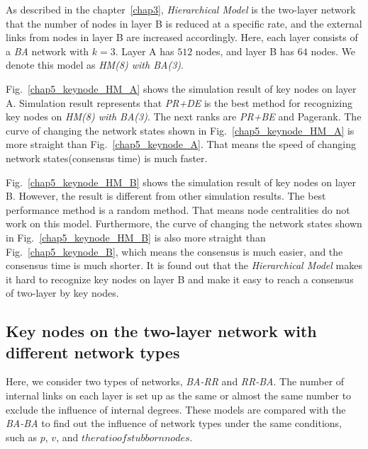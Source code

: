 As described in the chapter~\ref{chap3}, \textit{Hierarchical Model} is the two-layer network that the number of nodes in layer B is reduced at a specific rate, and the external links from nodes in layer B are increased accordingly. Here, each layer consists of a \textit{BA} network with $k=3$. Layer A has $512$ nodes, and layer B has $64$ nodes. We denote this model as \textit{HM(8) with BA(3)}.

Fig.~\ref{chap5_keynode_HM_A} shows the simulation result of key nodes on layer A. Simulation result represents that \textit{PR+DE} is the best method for recognizing key nodes on \textit{HM(8) with BA(3)}. The next ranks are \textit{PR+BE} and Pagerank. The curve of changing the network states shown in Fig.~\ref{chap5_keynode_HM_A} is more straight than Fig.~\ref{chap5_keynode_A}. That means the speed of changing network states(consensus time) is much faster. 

Fig.~\ref{chap5_keynode_HM_B} shows the simulation result of key nodes on layer B. However, the result is different from other simulation results. The best performance method is a random method. That means node centralities do not work on this model. Furthermore, the curve of changing the network states shown in Fig.~\ref{chap5_keynode_HM_B} is also more straight than Fig.~\ref{chap5_keynode_B}, which means the consensus is much easier, and the consensus time is much shorter. It is found out that the \textit{Hierarchical Model} makes it hard to recognize key nodes on layer B and make it easy to reach a consensus of two-layer by key nodes. \\

\subsection{Key nodes on the two-layer network with different network types}
Here, we consider two types of networks, \textit{BA-RR} and \textit{RR-BA}. The number of internal links on each layer is set up as the same or almost the same number to exclude the influence of internal degrees. These models are compared with the \textit{BA-BA} to find out the influence of network types under the same conditions, such as $p$, $v$, and $the ratio of stubborn nodes$.  

